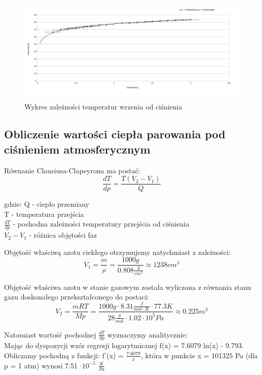 \documentclass{article}
\begin{document}
\begin{figure}[h!]
\centering
\includegraphics[scale=0.51]{ch01}
\caption{Wykres zależności temperatur wrzenia od ciśnienia}
\end{figure}

\subsection{Obliczenie wartości ciepła parowania pod ciśnieniem atmosferycznym}

Równanie Clausiusa-Clapeyrona ma postać:
\begin{equation}
	\frac{dT}{dp} = \frac{T(V_{2}-V_{1})}{Q}
\end{equation}

gdzie:
Q - ciepło przemiany \\
T - temperatura przejścia \\
$\frac{dT}{dp}$ - pochodna zależności temperatury przejścia od ciśnienia \\ 
$V_{2}-V_{1}$ - różnica objętości faz

Objętość właściwą azotu ciekłego otrzymujemy natychmiast z zależności:
\begin{equation}
	V_1 = \frac{m}{\rho} = \frac{1000 g}{0.808 \frac{g}{cm^3}} \approx 1238 cm^3
\end{equation}

Objętość właściwa azotu w stanie gazowym została wyliczona z równania stanu gazu doskonałego przekształconego do postaci:
\begin{equation}
	V_2 = \frac{mRT}{Mp} = \frac{1000 g \cdot 8.31 \frac{J}{mol \cdot K } \cdot 77.3K}{28 \frac{g}{mol} \cdot 1.02 \cdot 10^5 Pa} \approx 0.225 m^3
\end{equation}

Natomiast wartość pochodnej $\frac{dT}{dp}$ wyznaczymy analitycznie:\\
Mając do dyspozycji wzór regresji logarytmicznej f(x) = 7.6079 ln(x) - 	9.793. Obliczamy pochodną z funkcji: f'(x) = $\frac{7.6079}{x}$, która w punkcie x = 101325 Pa (dla p = 1 atm) wynosi 7.51 $\cdot 10^{-5}$ $\frac{K}{Pa}$
\end{document}
